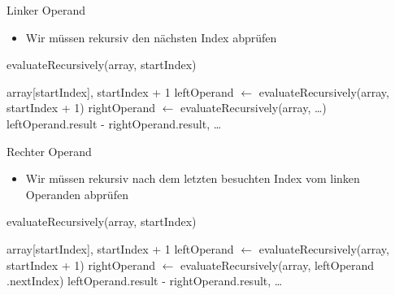 \documentclass{../tuda-beamer}
\begin{document}
    \begin{frame}{Linker Operand}
        \begin{itemize}
            \item Wir müssen rekursiv den nächsten Index abprüfen
        \end{itemize}

        \begin{algorithm}[H]
            \caption{evaluateRecursively(array, startIndex)}
            \begin{algorithmic}[1]
                    \State \Return array[startIndex], startIndex + 1
                \Else
                    \State leftOperand \(\leftarrow\) evaluateRecursively(array, startIndex + 1)
                    \State rightOperand \(\leftarrow\) evaluateRecursively(array, \dots)
                    \State \Return leftOperand.result - rightOperand.result, \dots
                \EndIf
            \end{algorithmic}
        \end{algorithm}
    \end{frame}

    \begin{frame}{Rechter Operand}
        \begin{itemize}
            \item Wir müssen rekursiv nach dem letzten besuchten Index vom linken Operanden
            abprüfen
        \end{itemize}

        \begin{algorithm}[H]
            \caption{evaluateRecursively(array, startIndex)}
            \begin{algorithmic}[1]
                    \State \Return array[startIndex], startIndex + 1
                \Else
                    \State leftOperand \(\leftarrow\) evaluateRecursively(array, startIndex + 1)
                    \State rightOperand \(\leftarrow\) evaluateRecursively(array, leftOperand
                    .nextIndex)
                    \State \Return leftOperand.result - rightOperand.result, \dots
                \EndIf
            \end{algorithmic}
        \end{algorithm}
    \end{frame}
\end{document}
